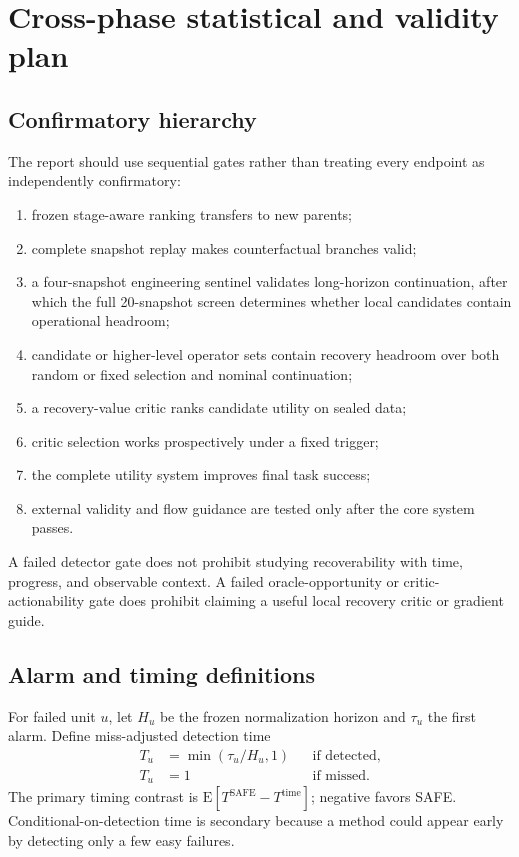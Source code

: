 \clearpage
\section{Cross-phase statistical and validity plan}

\subsection{Confirmatory hierarchy}

The report should use sequential gates rather than treating every endpoint as independently confirmatory:
\begin{enumerate}
  \item frozen stage-aware ranking transfers to new parents;
  \item complete snapshot replay makes counterfactual branches valid;
  \item a four-snapshot engineering sentinel validates long-horizon continuation, after which the full 20-snapshot screen determines whether local candidates contain operational headroom;
  \item candidate or higher-level operator sets contain recovery headroom over both random or fixed selection and nominal continuation;
  \item a recovery-value critic ranks candidate utility on sealed data;
  \item critic selection works prospectively under a fixed trigger;
  \item the complete utility system improves final task success;
  \item external validity and flow guidance are tested only after the core system passes.
\end{enumerate}

A failed detector gate does not prohibit studying recoverability with time, progress, and observable context. A failed oracle-opportunity or critic-actionability gate does prohibit claiming a useful local recovery critic or gradient guide.

\subsection{Alarm and timing definitions}

For failed unit $u$, let $H_u$ be the frozen normalization horizon and $\tau_u$ the first alarm. Define miss-adjusted detection time
\begin{align}
T_u &= \min(\tau_u/H_u,1) && \text{if detected},\\
T_u &= 1 && \text{if missed}.
\end{align}
The primary timing contrast is $\mathrm{E}[T^{\mathrm{SAFE}}-T^{\mathrm{time}}]$; negative favors SAFE. Conditional-on-detection time is secondary because a method could appear early by detecting only a few easy failures.

